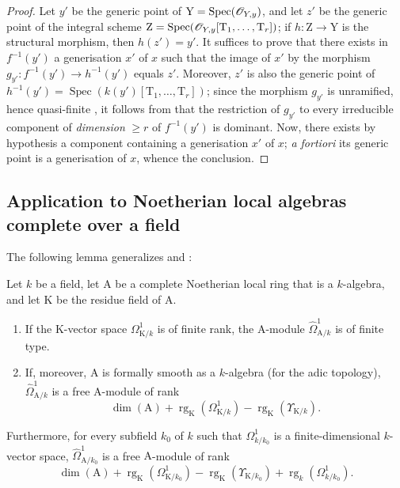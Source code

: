 \begin{proof}
Let $y'$ be the generic point of $\mathrm{Y}=\operatorname{Spec}(\mathscr{O}_{Y,y})$, and let $z'$ be the generic point of the integral scheme $\mathrm{Z}=\operatorname{Spec}(\mathscr{O}_{Y,y}[\mathrm{T}_1,\ldots,\mathrm{T}_r])$; if $h:\mathrm{Z}\to\mathrm{Y}$ is the structural morphism, then $h(z')=y'$.
It suffices to prove that there exists in $f^{-1}(y')$ a generisation $x'$ of $x$ such that the image of $x'$ by the morphism $g_{y'}:f^{-1}(y')\to h^{-1}(y')$ equals $z'$.
Moreover, $z'$ is also the generic point of $h^{-1}(y')=\operatorname{Spec}(k(y')[\mathrm{T}_1,\ldots,\mathrm{T}_r])$; since the morphism $g_{y'}$ is unramified, hence quasi-finite , it follows from  that the restriction of $g_{y'}$ to every irreducible component of \emph{dimension} $\geq r$ of $f^{-1}(y')$ is dominant.
Now, there exists by hypothesis a component containing a generisation $x'$ of $x$; \emph{a fortiori} its generic point is a generisation of $x$, whence the conclusion.
\end{proof}

\subsection{Application to Noetherian local algebras complete over a field}
\label{subsection:IV.18.11}

The following lemma generalizes  and :

\begin{lemma}[18.11.1]
\label{IV.18.11.1}
Let $k$ be a field, let $\mathrm{A}$ be a complete Noetherian local ring that is a $k$-algebra, and let $\mathrm{K}$ be the residue field of $\mathrm{A}$.
\begin{enumerate}[label=(\roman*)]
  \item If the $\mathrm{K}$-vector space $\Omega^1_{\mathrm{K}/k}$ is of finite rank, the $\mathrm{A}$-module $\hat{\Omega}^1_{\mathrm{A}/k}$ is of finite type.
  \item If, moreover, $\mathrm{A}$ is formally smooth as a $k$-algebra (for the adic topology), $\hat{\Omega}^1_{\mathrm{A}/k}$ is a free $\mathrm{A}$-module of rank
\[
  \dim(\mathrm{A})+\operatorname{rg}_{\mathrm{K}}(\Omega^1_{\mathrm{K}/k})-\operatorname{rg}_{\mathrm{K}}(\Upsilon_{\mathrm{K}/k}).
\]
\end{enumerate}
Furthermore, for every subfield $k_0$ of $k$ such that $\Omega^1_{k/k_0}$ is a finite-dimensional $k$-vector space, $\hat{\Omega}^1_{\mathrm{A}/k_0}$ is a free $\mathrm{A}$-module of rank
\[
  \dim(\mathrm{A})+\operatorname{rg}_{\mathrm{K}}(\Omega^1_{\mathrm{K}/k_0})-\operatorname{rg}_{\mathrm{K}}(\Upsilon_{\mathrm{K}/k_0})+\operatorname{rg}_{k}(\Omega^1_{k/k_0}).
\]
\end{lemma}

